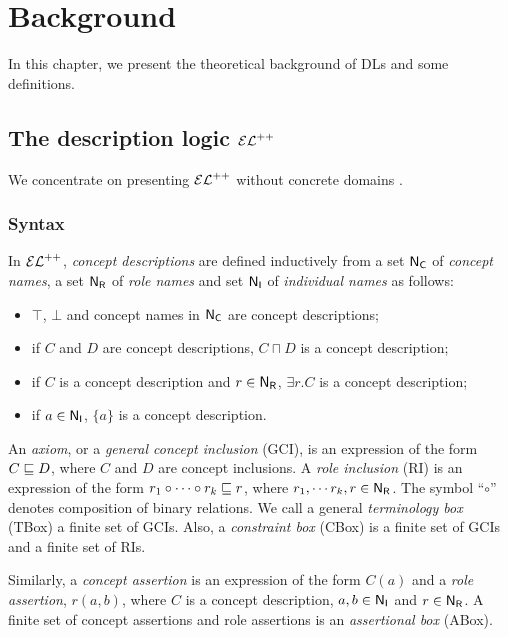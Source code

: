 
\chapter{Background}
\label{cap:background}

In this chapter, we present the theoretical background of DLs and some definitions. 

\section{The description logic \texorpdfstring{$\mathcal{EL}^{++}$}{𝓔𝓛++}}

We concentrate on presenting $\mathcal{EL}^{++}$ without concrete domains \citep{Baader2005a}. 

\subsection{Syntax}
In $\mathcal{EL}^{++}$, \emph{concept descriptions} are defined inductively from a set $\mathsf{N_C}$ of \emph{concept names}, a set $\mathsf{N_R}$ of \emph{role names} and set $\mathsf{N_I}$ of \emph{individual names} as follows:
\begin{itemize}
  \item $\top$, $\bot$ and concept names in $\mathsf{N_C}$ are concept descriptions;
  \item if $C$ and $D$ are concept descriptions, $C \sqcap D$ is a concept description;
  \item if $C$ is a concept description and $r \in \mathsf{N_R}$, $\exists r.C$ is a concept description;
  \item if $a \in \mathsf{N_I}$, $\{a\}$ is a concept description.
\end{itemize}


An \emph{axiom}, or a \emph{general concept inclusion} (GCI), is an expression of the form $C \sqsubseteq D$, where $C$ and $D$ are concept inclusions. A \emph{role inclusion} (RI) is an expression of the form $r_1 \circ \cdots \circ r_k \sqsubseteq r$, where $r_1, \cdots r_k, r \in \mathsf{N_R}$.  The symbol ``$\circ$'' denotes composition of binary relations. We call a general \emph{terminology box} (TBox) a finite set of GCIs. Also, a \emph{constraint box} (CBox) is a finite set of GCIs and a finite set of RIs. 

Similarly, a \emph{concept assertion} is an expression of the form $C(a)$ and a \emph{role assertion}, $r(a, b)$, where $C$ is a concept description, $a, b \in \mathsf{N_I}$ and $r \in \mathsf{N_R}$. A finite set of concept assertions and role assertions is an \emph{assertional box} (ABox).


